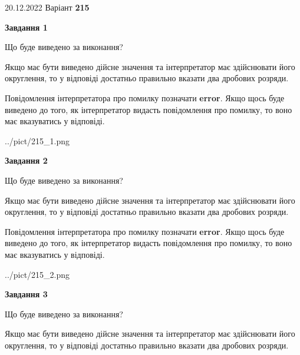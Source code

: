 \documentclass[12pt, ukrainian]{article}
\begin{document}
{20.12.2022 Варіант \No \textbf { 215 }\par}
{
\begin {Large}

{\begin {center}\textbf{Завдання 1}\end {center}}\par
Що буде виведено за виконання? \par

Якщо має бути виведено дійсне значення та інтерпретатор має здійснювати його округлення, 
то у відповіді достатньо правильно вказати два дробових розряди.

Повідомлення інтерпретатора про помилку позначати \textbf{error}.
Якщо щось буде виведено до того, як інтерпретатор видасть повідомлення про помилку, 
то воно має вказуватись у відповіді. \par

\begin{center}
	{../pict/215_1.png}
\end{center}
\newpage

{\begin {center}\textbf{Завдання 2}\end {center}}\par
Що буде виведено за виконання? \par

Якщо має бути виведено дійсне значення та інтерпретатор має здійснювати його округлення, 
то у відповіді достатньо правильно вказати два дробових розряди.

Повідомлення інтерпретатора про помилку позначати \textbf{error}.
Якщо щось буде виведено до того, як інтерпретатор видасть повідомлення про помилку, 
то воно має вказуватись у відповіді. \par

\begin{center}
	{../pict/215_2.png}
\end{center}
\newpage

{\begin {center}\textbf{Завдання 3}\end {center}}\par
Що буде виведено за виконання? \par

Якщо має бути виведено дійсне значення та інтерпретатор має здійснювати його округлення, 
то у відповіді достатньо правильно вказати два дробових розряди.


\end{Large}}
\end{document}

